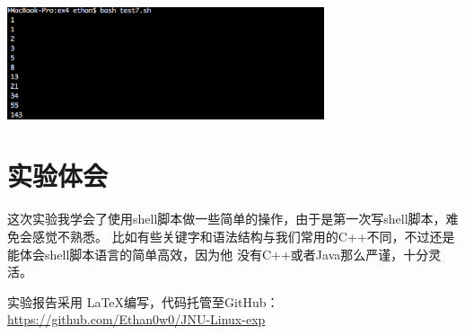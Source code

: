 \documentclass{JNUexp}
\begin{document}
\begin{answer}
    
\end{answer}

\begin{image}
    \includegraphics[width=0.7\textwidth]{6}
\end{image}


\section{实验体会}

这次实验我学会了使用shell脚本做一些简单的操作，由于是第一次写shell脚本，难免会感觉不熟悉。
比如有些关键字和语法结构与我们常用的C++不同，不过还是能体会shell脚本语言的简单高效，因为他
没有C++或者Java那么严谨，十分灵活。\\
\vfill

实验报告采用 \LaTeX 编写，代码托管至GitHub：\\
\url{https://github.com/Ethan0w0/JNU-Linux-exp}
\end{document}
